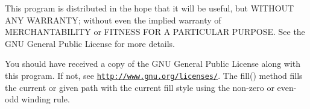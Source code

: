 This program is distributed in the hope that it will be useful, but W\+I\+T\+H\+O\+U\+T A\+N\+Y W\+A\+R\+R\+A\+N\+T\+Y; without even the implied warranty of M\+E\+R\+C\+H\+A\+N\+T\+A\+B\+I\+L\+I\+T\+Y or F\+I\+T\+N\+E\+S\+S F\+O\+R A P\+A\+R\+T\+I\+C\+U\+L\+A\+R P\+U\+R\+P\+O\+S\+E. See the G\+N\+U General Public License for more details.

You should have received a copy of the G\+N\+U General Public License along with this program. If not, see \href{http://www.gnu.org/licenses/}{\tt http\+://www.\+gnu.\+org/licenses/}. The fill() method fills the current or given path with the current fill style using the non-\/zero or even-\/odd winding rule. 